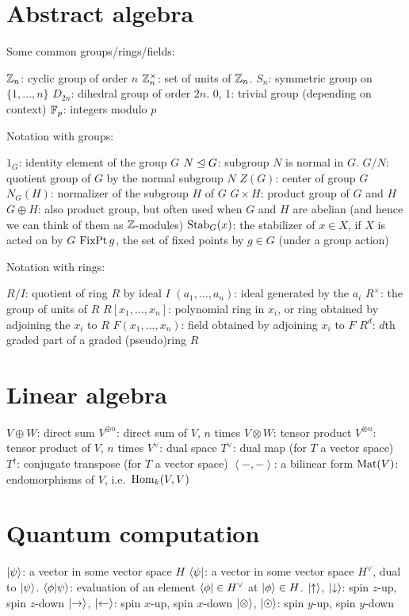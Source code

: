 \section{Abstract algebra}
Some common groups/rings/fields:
\begin{itemize}
	\ii $\mathbb Z_{n}$: cyclic group of order $n$
	\ii $\mathbb Z_{n}^\times$: set of units of $\mathbb Z_{n}$.
	\ii $S_n$: symmetric group on $\{1, \dots, n\}$
	\ii $D_{2n}$: dihedral group of order $2n$.
	\ii $0$, $1$: trivial group (depending on context)
	\ii $\mathbb F_p$: integers modulo $p$
\end{itemize}
Notation with groups:
\begin{itemize}
	\ii $1_G$: identity element of the group $G$
	\ii $N \trianglelefteq G$: subgroup $N$ is normal in $G$.
	\ii $G/N$: quotient group of $G$ by the normal subgroup $N$
	\ii $Z(G)$: center of group $G$
	\ii $N_G(H)$: normalizer of the subgroup $H$ of $G$
	\ii $G \times H$: product group of $G$ and $H$
	\ii $G \oplus H$: also product group,
	but often used when $G$ and $H$ are abelian
	(and hence we can think of them as $\mathbb Z$-modules)
	\ii $\operatorname{Stab}_G(x)$: the stabilizer of $x \in X$, if $X$ is acted on by $G$
	\ii $\operatorname{FixPt} g$, the set of fixed points by $g \in G$ (under a group action)
\end{itemize}
Notation with rings:
\begin{itemize}
	\ii $R/I$: quotient of ring $R$ by ideal $I$
	\ii $(a_1, \dots, a_n)$: ideal generated by the $a_i$
	\ii $R^\times$: the group of units of $R$
	\ii $R[x_1, \dots, x_n]$: polynomial ring in $x_i$,
	or ring obtained by adjoining the $x_i$ to $R$
	\ii $F(x_1, \dots, x_n)$: field obtained by adjoining $x_i$ to $F$
	\ii $R^d$: $d$th graded part of a graded (pseudo)ring $R$
\end{itemize}

\section{Linear algebra}
\begin{itemize}
	\ii $V \oplus W$: direct sum
	\ii $V^{\oplus n}$: direct sum of $V$, $n$ times
	\ii $V \otimes W$: tensor product
	\ii $V^{\otimes n}$: tensor product of $V$, $n$ times
	\ii $V^\vee$: dual space
	\ii $T^\vee$: dual map (for $T$ a vector space)
	\ii $T^\dagger$: conjugate transpose (for $T$ a vector space)
	\ii $\left< -,-\right>$: a bilinear form
	\ii $\mathrm{Mat}(V)$: endomorphisms of $V$, i.e.\ $\operatorname{Hom}_k(V,V)$
\end{itemize}
\section{Quantum computation}
\begin{itemize}
	\ii $\ket{\psi}$: a vector in some vector space $H$
	\ii $\bra{\psi}$: a vector in some vector space $H^\vee$, dual to $\ket{\psi}$.
	\ii $\braket{\phi|\psi}$: evaluation of an element $\bra{\phi} \in H^\vee$ at $\ket{\phi} \in H$.
	\ii $\ket\uparrow$, $\ket\downarrow$: spin $z$-up, spin $z$-down
	\ii $\ket\rightarrow$, $\ket\leftarrow$: spin $x$-up, spin $x$-down
	\ii $\ket\otimes$, $\ket\odot$: spin $y$-up, spin $y$-down
\end{itemize}

